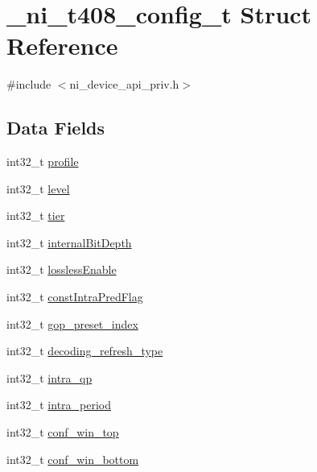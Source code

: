 \hypertarget{struct__ni__t408__config__t}{}\section{\+\_\+ni\+\_\+t408\+\_\+config\+\_\+t Struct Reference}
\label{struct__ni__t408__config__t}


{\ttfamily \#include $<$ni\+\_\+device\+\_\+api\+\_\+priv.\+h$>$}

\subsection*{Data Fields}
\begin{DoxyCompactItemize}
\item 
int32\+\_\+t \mbox{\hyperlink{struct__ni__t408__config__t_affcdae80c74d5751541b067c5ab1a861}{profile}}
\item 
int32\+\_\+t \mbox{\hyperlink{struct__ni__t408__config__t_a89eb5b8aeacf564f248d836e4ea62f8e}{level}}
\item 
int32\+\_\+t \mbox{\hyperlink{struct__ni__t408__config__t_ad2508d8d2585df6bbf886b7143ef6f2a}{tier}}
\item 
int32\+\_\+t \mbox{\hyperlink{struct__ni__t408__config__t_a73b6f46813774425db353b023cb552cf}{internal\+Bit\+Depth}}
\item 
int32\+\_\+t \mbox{\hyperlink{struct__ni__t408__config__t_a1d850cd27f39c5f7f7f9559225b94596}{lossless\+Enable}}
\item 
int32\+\_\+t \mbox{\hyperlink{struct__ni__t408__config__t_a0bcee272b1e72401be02fff9e5c56c6d}{const\+Intra\+Pred\+Flag}}
\item 
int32\+\_\+t \mbox{\hyperlink{struct__ni__t408__config__t_ab0b73cbef66b6ba4166889a36bb20d4a}{gop\+\_\+preset\+\_\+index}}
\item 
int32\+\_\+t \mbox{\hyperlink{struct__ni__t408__config__t_a536cda1521aab86fe11a8af60dfba81b}{decoding\+\_\+refresh\+\_\+type}}
\item 
int32\+\_\+t \mbox{\hyperlink{struct__ni__t408__config__t_a02161a1953a870e2b5dcf24c1bef3d10}{intra\+\_\+qp}}
\item 
int32\+\_\+t \mbox{\hyperlink{struct__ni__t408__config__t_ac5dad8bef407cf664f56517a7b39e424}{intra\+\_\+period}}
\item 
int32\+\_\+t \mbox{\hyperlink{struct__ni__t408__config__t_ab6956f53cb5a13e13bae34ebc7191735}{conf\+\_\+win\+\_\+top}}
\item 
int32\+\_\+t \mbox{\hyperlink{struct__ni__t408__config__t_a9797f2600ca1736cf53756aab35a84aa}{conf\+\_\+win\+\_\+bottom}}

\end{DoxyCompactItemize}
